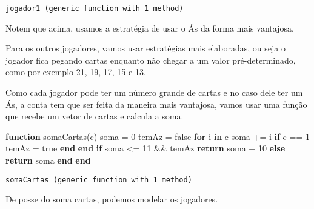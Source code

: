 \documentclass[
  letterpaper,
  DIV=11,
  numbers=noendperiod]{scrreprt}
\newenvironment{Shaded}{\begin{snugshade}}{\end{snugshade}}
\newcommand{\ConstantTok}[1]{\textcolor[rgb]{0.56,0.35,0.01}{#1}}
\newcommand{\ControlFlowTok}[1]{\textcolor[rgb]{0.00,0.23,0.31}{\textbf{#1}}}
\newcommand{\FloatTok}[1]{\textcolor[rgb]{0.68,0.00,0.00}{#1}}
\newcommand{\FunctionTok}[1]{\textcolor[rgb]{0.28,0.35,0.67}{#1}}
\newcommand{\KeywordTok}[1]{\textcolor[rgb]{0.00,0.23,0.31}{\textbf{#1}}}
\newcommand{\NormalTok}[1]{\textcolor[rgb]{0.00,0.23,0.31}{#1}}
\newcommand{\OperatorTok}[1]{\textcolor[rgb]{0.37,0.37,0.37}{#1}}
\begin{document}
\begin{verbatim}
jogador1 (generic function with 1 method)
\end{verbatim}

Notem que acima, usamos a estratégia de usar o Ás da forma mais
vantajosa.

Para os outros jogadores, vamos usar estratégias mais elaboradas, ou
seja o jogador fica pegando cartas enquanto não chegar a um valor
pré-determinado, como por exemplo 21, 19, 17, 15 e 13.

Como cada jogador pode ter um número grande de cartas e no caso dele ter
um Ás, a conta tem que ser feita da maneira mais vantajosa, vamos usar
uma função que recebe um vetor de cartas e calcula a soma.

\begin{Shaded}
\begin{Highlighting}[]
\KeywordTok{function} \FunctionTok{somaCartas}\NormalTok{(c)}
\NormalTok{  soma }\OperatorTok{=} \FloatTok{0}
\NormalTok{  temAz }\OperatorTok{=} \ConstantTok{false}
  \ControlFlowTok{for}\NormalTok{ i }\KeywordTok{in}\NormalTok{ c}
\NormalTok{    soma }\OperatorTok{+=}\NormalTok{ i}
    \ControlFlowTok{if}\NormalTok{ c }\OperatorTok{==} \FloatTok{1} 
\NormalTok{      temAz }\OperatorTok{=} \ConstantTok{true}
    \ControlFlowTok{end}
  \ControlFlowTok{end}
  \ControlFlowTok{if}\NormalTok{ soma }\OperatorTok{\textless{}=} \FloatTok{11} \OperatorTok{\&\&}\NormalTok{ temAz}
      \ControlFlowTok{return}\NormalTok{ soma }\OperatorTok{+} \FloatTok{10}
  \ControlFlowTok{else} 
      \ControlFlowTok{return}\NormalTok{ soma}
  \ControlFlowTok{end}
\KeywordTok{end}
\end{Highlighting}
\end{Shaded}

\begin{verbatim}
somaCartas (generic function with 1 method)
\end{verbatim}

De posse do soma cartas, podemos modelar os jogadores.
\end{document}
